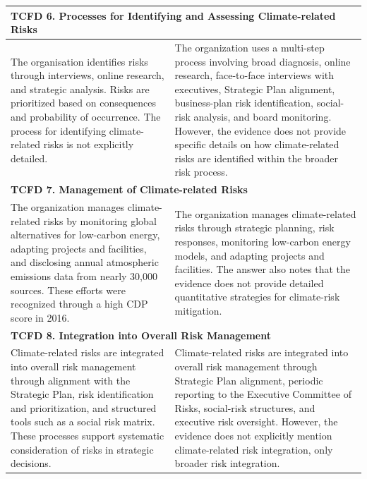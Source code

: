 \documentclass[11pt]{article}
\begin{document}
\begin{table}[t]
{\begin{tabular}{p{}|p{}}
\multicolumn{2}{l}{\textbf{TCFD 6. Processes for Identifying and Assessing Climate-related Risks}} \\
\hline
The organisation identifies risks through interviews, online research, and strategic analysis. 
Risks are prioritized based on consequences and probability of occurrence. 
\textcolor{caseblue}{The process for identifying climate-related risks is not explicitly detailed.}
&
The organization uses a multi-step process involving broad diagnosis, online research, face-to-face interviews with executives, Strategic Plan alignment, business-plan risk identification, social-risk analysis, and board monitoring. 
\textcolor{casered}{However, the evidence does not provide specific details on how climate-related risks are identified within the broader risk process.}
\\
\hline

\multicolumn{2}{l}{\textbf{TCFD 7. Management of Climate-related Risks}} \\
\hline
The organization manages climate-related risks by monitoring global alternatives for low-carbon energy, adapting projects and facilities, and disclosing annual atmospheric emissions data from nearly 30,000 sources. 
These efforts were recognized through a high CDP score in 2016.
&
The organization manages climate-related risks through strategic planning, risk responses, monitoring low-carbon energy models, and adapting projects and facilities. 
The answer also notes that the evidence does not provide detailed quantitative strategies for climate-risk mitigation.
\\
\hline

\multicolumn{2}{l}{\textbf{TCFD 8. Integration into Overall Risk Management}} \\
\hline
Climate-related risks are integrated into overall risk management through alignment with the Strategic Plan, risk identification and prioritization, and structured tools such as a social risk matrix. 
These processes support systematic consideration of risks in strategic decisions.
&
Climate-related risks are integrated into overall risk management through Strategic Plan alignment, periodic reporting to the Executive Committee of Risks, social-risk structures, and executive risk oversight. 
\textcolor{casered}{However, the evidence does not explicitly mention climate-related risk integration, only broader risk integration.}
\\
\hline


\end{tabular}}
\end{table}
\end{document}
